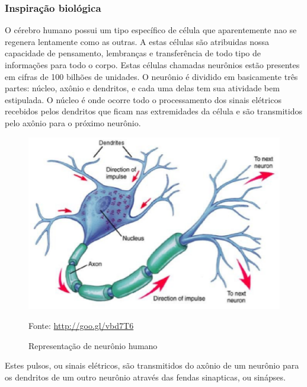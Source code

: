 \subsubsection{Inspiração biológica}

    O cérebro humano possui um tipo específico de célula que aparentemente nao se regenera lentamente como as outras. A estas células são atribuidas nossa capacidade de pensamento, lembranças e transferência de todo tipo de informações para todo o corpo. Estas células chamadas neurônios estão presentes em cifras de 100 bilhões de unidades. \cite{anderson1992artificial}
    O neurônio é dividido em basicamente três partes: núcleo, axônio e dendritos, e cada uma delas tem sua atividade bem estipulada. O núcleo é onde ocorre todo o processamento dos sinais elétricos recebidos pelos dendritos que ficam nas extremidades da célula e são transmitidos pelo axônio para o próximo neurônio.

    \begin{figure}[h]
        \centering
        \label{fig01}
            \includegraphics[keepaspectratio=true, scale=0.4]{editaveis/images/neuronio.eps}
        \caption{Representação de neurônio humano}
        Fonte: \url{http://goo.gl/vbd7T6}
    \end{figure}

    Estes pulsos, ou sinais elétricos, são transmitidos do axônio de um neurônio para os dendritos de um outro neurônio através das fendas sinapticas, ou sinápses.

